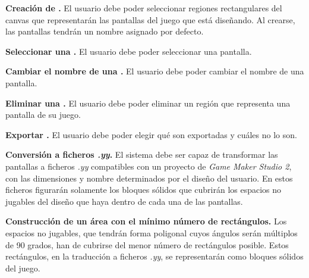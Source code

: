 	\item \textbf{Creación de .}\newline
		El usuario debe poder seleccionar regiones rectangulares del canvas que representarán las pantallas del juego que está diseñando. Al crearse, las pantallas tendrán un nombre asignado por defecto.
	\item \textbf{Seleccionar una .}\newline
		El usuario debe poder seleccionar una pantalla.
	\item \textbf{Cambiar el nombre de una .}\newline
		El usuario debe poder cambiar el nombre de una pantalla.
	\item \textbf{Eliminar una .}\newline
		El usuario debe poder eliminar un región que representa una pantalla de su juego.
	\item \textbf{Exportar .}\newline
		El usuario debe poder elegir qué  son exportadas y cuáles no lo son.
	\item\label{PARTICULAR:REQUISITO31} \textbf{Conversión a ficheros \textit{.yy}.}\newline
		El sistema debe ser capaz de transformar las pantallas a ficheros \textit{.yy} compatibles con un proyecto de \textit{Game Maker Studio 2}, con las dimensiones y nombre determinados por el diseño del usuario. En estos ficheros figurarán solamente los bloques sólidos que cubrirán los espacios no jugables del diseño que haya dentro de cada una de las pantallas.
		\begin{functional}
			\item \textbf{Construcción de un área con el mínimo número de rectángulos.}\newline
				Los espacios no jugables, que tendrán forma poligonal cuyos ángulos serán múltiplos de 90 grados, han de cubrirse del menor número de rectángulos posible. Estos rectángulos, en la traducción a ficheros \textit{.yy}, se representarán como bloques sólidos del juego.
		\end{functional}
